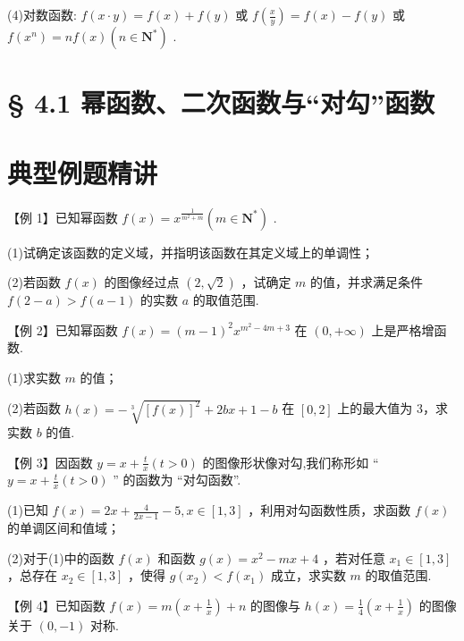 (4)对数函数: $f\left( {x \cdot  y}\right)  = f\left( x\right)  + f\left( y\right)$ 或 $f\left( \frac{x}{y}\right)  = f\left( x\right)  - f\left( y\right)$ 或 $f\left( {x}^{n}\right)  = {nf}\left( x\right) \left( {n \in  {\mathbf{N}}^{ * }}\right)$ .

\section*{§ 4.1 幂函数、二次函数与“对勾”函数}

\section*{典型例题精讲}

【例 1】已知幂函数 $f\left( x\right)  = {x}^{\frac{1}{{m}^{2} + m}}\left( {m \in  {\mathbf{N}}^{ * }}\right)$ .

(1)试确定该函数的定义域，并指明该函数在其定义域上的单调性；

(2)若函数 $f\left( x\right)$ 的图像经过点 $\left( {2,\sqrt{2}}\right)$ ，试确定 $m$ 的值，并求满足条件 $f\left( {2 - a}\right)  > f\left( {a - 1}\right)$ 的实数 $a$ 的取值范围.

【例 2】已知幂函数 $f\left( x\right)  = {\left( m - 1\right) }^{2}{x}^{m{}^{2} - {4m} + 3}$ 在 $\left( {0, + \infty }\right)$ 上是严格增函数.

(1)求实数 $m$ 的值；

(2)若函数 $h\left( x\right)  =  - \sqrt[3]{{\left\lbrack  f\left( x\right) \right\rbrack  }^{2}} + {2bx} + 1 - b$ 在 $\left\lbrack  {0,2}\right\rbrack$ 上的最大值为 3，求实数 $b$ 的值.

【例 3】因函数 $y = x + \frac{t}{x}\left( {t > 0}\right)$ 的图像形状像对勾,我们称形如 “ $y = x + \frac{t}{x}\left( {t > 0}\right)$ ” 的函数为 “对勾函数”.

(1)已知 $f\left( x\right)  = {2x} + \frac{4}{{2x} - 1} - 5,x \in  \left\lbrack  {1,3}\right\rbrack$ ，利用对勾函数性质，求函数 $f\left( x\right)$ 的单调区间和值域；

(2)对于(1)中的函数 $f\left( x\right)$ 和函数 $g\left( x\right)  = {x}^{2} - {mx} + 4$ ，若对任意 ${x}_{1} \in  \left\lbrack  {1,3}\right\rbrack$ ，总存在 ${x}_{2} \in  \left\lbrack  {1,3}\right\rbrack$ ，使得 $g\left( {x}_{2}\right)  < f\left( {x}_{1}\right)$ 成立，求实数 $m$ 的取值范围.

【例 4】已知函数 $f\left( x\right)  = m\left( {x + \frac{1}{x}}\right)  + n$ 的图像与 $h\left( x\right)  = \frac{1}{4}\left( {x + \frac{1}{x}}\right)$ 的图像关于 $\left( {0, - 1}\right)$ 对称.

